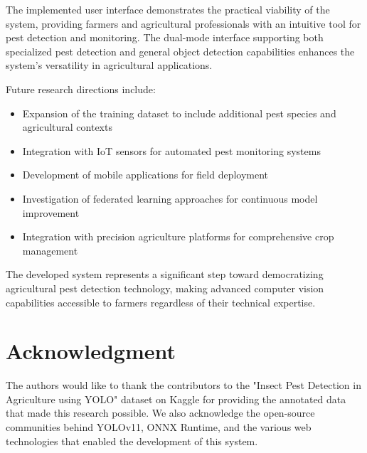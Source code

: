\documentclass[conference]{IEEEtran}
\begin{document}
The implemented user interface demonstrates the practical viability of the system, providing farmers and agricultural professionals with an intuitive tool for pest detection and monitoring. The dual-mode interface supporting both specialized pest detection and general object detection capabilities enhances the system's versatility in agricultural applications.

Future research directions include:
\begin{itemize}
\item Expansion of the training dataset to include additional pest species and agricultural contexts
\item Integration with IoT sensors for automated pest monitoring systems
\item Development of mobile applications for field deployment
\item Investigation of federated learning approaches for continuous model improvement
\item Integration with precision agriculture platforms for comprehensive crop management
\end{itemize}

The developed system represents a significant step toward democratizing agricultural pest detection technology, making advanced computer vision capabilities accessible to farmers regardless of their technical expertise.

\section*{Acknowledgment}

The authors would like to thank the contributors to the "Insect Pest Detection in Agriculture using YOLO" dataset on Kaggle for providing the annotated data that made this research possible. We also acknowledge the open-source communities behind YOLOv11, ONNX Runtime, and the various web technologies that enabled the development of this system.
\end{document}

